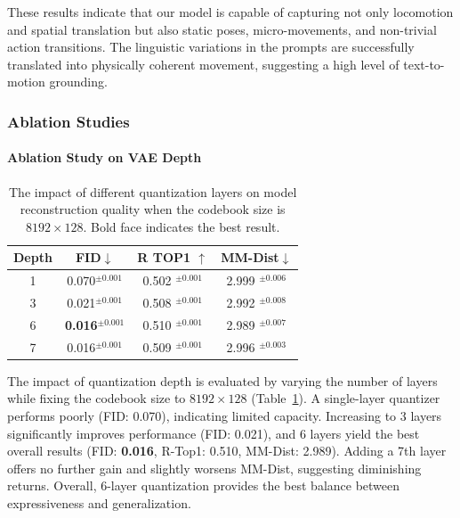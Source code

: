\documentclass[a4paper,12pt]{article}
\begin{document}
These results indicate that our model is capable of capturing not only locomotion and spatial translation but also static poses, micro-movements, and non-trivial action transitions. The linguistic variations in the prompts are successfully translated into physically coherent movement, suggesting a high level of text-to-motion grounding.

\subsubsection{Ablation Studies}
\paragraph{Ablation Study on VAE Depth}
\begin{table}[t]
\centering
\scriptsize
\setlength{\tabcolsep}{10pt}
\renewcommand{\arraystretch}{1.2}
\begin{tabular}{cccc}
\toprule
\textbf{Depth} & \textbf{FID}$\downarrow$& \textbf{R TOP1 $\uparrow$} & MM-Dist$\downarrow$\\
\midrule
1 & 0.070$^{\pm 0.001}$ & 0.502 $^{\pm 0.001}$ & 2.999 $^{\pm 0.006}$\\
3 & 0.021$^{\pm 0.001}$  & 0.508 $^{\pm 0.001}$& 2.992 $^{\pm 0.008}$\\
6 & \textbf{0.016}$^{\pm 0.001}$ & 0.510 $^{\pm 0.001}$ & 2.989 $^{\pm 0.007}$\\
7 & 0.016$^{\pm 0.001}$ & 0.509 $^{\pm 0.001}$ & 2.996 $^{\pm 0.003}$\\
\bottomrule
\end{tabular}
\caption{The impact of different quantization layers on model reconstruction quality when the codebook size is $8192 \times 128$. Bold face indicates the best result.}
\label{tab:compare_vae_kitml}
\end{table}
The impact of quantization depth is evaluated by varying the number of layers while fixing the codebook size to $8192 \times 128$ (Table~\ref{tab:compare_vae_kitml}). A single-layer quantizer performs poorly (FID: 0.070), indicating limited capacity. Increasing to 3 layers significantly improves performance (FID: 0.021), and 6 layers yield the best overall results (FID: \textbf{0.016}, R-Top1: 0.510, MM-Dist: 2.989). Adding a 7th layer offers no further gain and slightly worsens MM-Dist, suggesting diminishing returns. Overall, 6-layer quantization provides the best balance between expressiveness and generalization.
\end{document}
